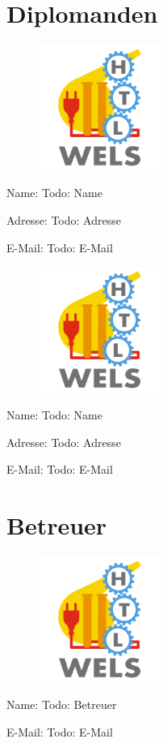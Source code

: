 \chapter*{Diplomanden}

\label{Diplomanden}

\begin{figure}[h]
\flushleft
\includegraphics[width = 4cm]{img/HTLLogo.png}
\end{figure}
Name: Todo: Name

\bigskip
Adresse: Todo: Adresse

\bigskip
E-Mail: Todo: E-Mail

\begin{figure}[h]
\flushleft
\includegraphics[width = 4cm]{img/HTLLogo.png}
\end{figure}

Name: Todo: Name

\bigskip
Adresse: Todo: Adresse

\bigskip
E-Mail: Todo: E-Mail
 
 
\newpage
\chapter*{Betreuer}
 
\begin{figure}[h]
\flushleft
\includegraphics[width = 4cm]{img/HTLLogo.png}
\end{figure}

Name: Todo: Betreuer

\bigskip
E-Mail: Todo: E-Mail

